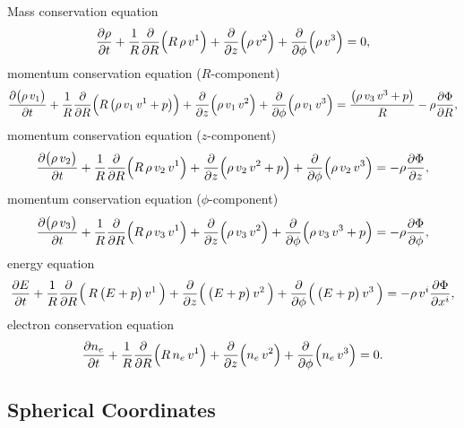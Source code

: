 \documentclass[10pt,preprint]{aastex}
\begin{document}
Mass conservation equation
\begin{equation}
  \frac{\partial \rho}{\partial t}
  +\frac{1}{R}\frac{\partial }{\partial R}\Big(R\,\rho\,v^{1}\Big)
  +\frac{\partial }{\partial z}\Big(\rho\,v^{2}\Big)
  +\frac{\partial }{\partial \phi}\Big(\rho\,v^{3}\Big)=0,
\end{equation}
momentum conservation equation ($R$-component)
\begin{equation}
  \frac{\partial \big(\rho\,v_{1}\big)}{\partial t}
  +\frac{1}{R}\frac{\partial }{\partial R}\Big(R\,\big(\rho\,v_{1}\,v^{1}+p\big)\Big)
  +\frac{\partial }{\partial z}\Big(\rho\,v_{1}\,v^{2}\Big)
  +\frac{\partial }{\partial \phi}\Big(\rho\,v_{1}\,v^{3}\Big)
  =\frac{\big(\rho\,v_{3}\,v^{3}+p\big)}{R}-\rho\frac{\partial \Phi}{\partial R},
\end{equation}
momentum conservation equation ($z$-component)
\begin{equation}
  \frac{\partial \big(\rho\,v_{2}\big)}{\partial t}
  +\frac{1}{R}\frac{\partial }{\partial R}\Big(R\,\rho\,v_{2}\,v^{1}\Big)
  +\frac{\partial }{\partial z}\Big(\rho\,v_{2}\,v^{2}+p\Big)
  +\frac{\partial }{\partial \phi}\Big(\rho\,v_{2}\,v^{3}\Big)=-\rho\frac{\partial \Phi}{\partial z},
\end{equation}
momentum conservation equation ($\phi$-component)
\begin{equation}
  \frac{\partial \big(\rho\,v_{3}\big)}{\partial t}
  +\frac{1}{R}\frac{\partial }{\partial R}\Big(R\,\rho\,v_{3}\,v^{1}\Big)
  +\frac{\partial }{\partial z}\Big(\rho\,v_{3}\,v^{2}\Big)
  +\frac{\partial }{\partial \phi}\Big(\rho\,v_{3}\,v^{3}+p\Big)
  =-\rho\frac{\partial \Phi}{\partial \phi},
\end{equation}
energy equation
\begin{equation}
  \frac{\partial E}{\partial t}+\frac{1}{R}\frac{\partial }{\partial R}\Big(\,R\,\big(E+p\big)\,v^{1}\,\Big)+\frac{\partial }{\partial z}\Big(\,\big(E+p\big)\,v^{2}\,\Big)+\frac{\partial }{\partial \phi}\Big(\,\big(E+p\big)\,v^{3}\,\Big)=-\rho\,v^{i}\frac{\partial \Phi}{\partial x^{i}},
\end{equation}
electron conservation equation
\begin{equation}
  \frac{\partial n_{e}}{\partial t}
  +\frac{1}{R}\frac{\partial }{\partial R}\Big(R\,n_{e}\,v^{1}\Big)
  +\frac{\partial }{\partial z}\Big(n_{e}\,v^{2}\Big)
  +\frac{\partial }{\partial \phi}\Big(n_{e}\,v^{3}\Big)=0.  
\end{equation}

\subsection{Spherical Coordinates}
\end{document}

